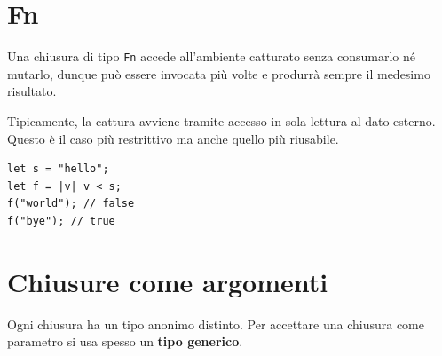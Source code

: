 

\section{Fn}

\begin{center}
  \begin{minipage}{0.6\linewidth}
    Una chiusura di tipo \verb|Fn| accede all'ambiente catturato senza consumarlo né
    mutarlo, dunque può essere invocata più volte e produrrà sempre il medesimo risultato.

    Tipicamente, la cattura avviene tramite accesso in sola lettura al dato esterno.
    Questo è il caso più restrittivo ma anche quello più riusabile.
  \end{minipage}%
  \hfill
  \begin{minipage}{0.35\linewidth}
    \begin{verbatim}
let s = "hello"; 
let f = |v| v < s; 
f("world"); // false 
f("bye"); // true 
\end{verbatim}
  \end{minipage}
\end{center}





\section{Chiusure come argomenti}
Ogni chiusura ha un tipo anonimo distinto. Per accettare una chiusura come
parametro si usa spesso un \textbf{tipo generico}.

